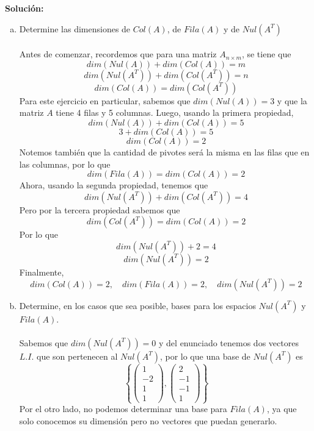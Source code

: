 \documentclass[12pt]{article}
\newenvironment{solucion}
{\begin{mdframed}[backgroundcolor=black!10]
		{\bf Solución:}\\
	}
	{
	\end{mdframed}
}
\newenvironment{preguntas}
{\begin{enumerate}\itemsep12pt
	}
	{
	\end{enumerate}
}
\begin{document}
\begin{preguntas}
\begin{solucion}
\begin{enumerate}[a)]
\item Determine las dimensiones de $Col(A)$, de $Fila(A)$ y de $Nul(A^T)$\\
			\\
			Antes de comenzar, recordemos que para una matriz $A_{n\times m}$, se tiene que
			$$dim(Nul(A)) + dim(Col(A)) = m$$
			$$dim(Nul(A^T)) + dim(Col(A^T)) = n$$
			$$dim(Col(A)) = dim(Col(A^T))$$
			Para este ejercicio en particular, sabemos que $dim(Nul(A)) = 3$ y que la matriz $A$ tiene 4 filas y 5 columnas. Luego, usando la primera propiedad,
			$$dim(Nul(A)) + dim(Col(A)) = 5$$
			$$3 + dim(Col(A)) = 5$$
			$$dim(Col(A)) = 2$$
			Notemos también que la cantidad de pivotes será la misma en las filas que en las columnas, por lo que
			$$dim(Fila(A)) = dim(Col(A)) = 2$$
			Ahora, usando la segunda propiedad, tenemos que
			$$dim(Nul(A^T)) + dim(Col(A^T)) = 4$$
			Pero por la tercera propiedad sabemos que 
			$$dim(Col(A^T)) = dim(Col(A)) = 2$$
			Por lo que
			$$dim(Nul(A^T)) + 2 = 4$$
			$$dim(Nul(A^T)) = 2$$
			Finalmente,
			$$dim(Col(A))=2,\quad dim(Fila(A))=2, \quad dim(Nul(A^T))=2$$
\item Determine, en los casos que sea posible, bases para los espacios $Nul(A^T)$ y $Fila(A)$.\\
			\\
			Sabemos que $dim(Nul(A^T))=0$ y del enunciado tenemos dos vectores $L.I.$ que son pertenecen al $Nul(A^T)$, por lo que una base de $Nul(A^T)$ es
			$$\left\{ \begin{pmatrix}
			1 \\ -2 \\ 1 \\ 1
			\end{pmatrix},
			\begin{pmatrix}
			2 \\ -1 \\ -1 \\ 1
			\end{pmatrix}\right\}$$
			Por el otro lado, no podemos determinar una base para $Fila(A)$, ya que solo conocemos su dimensión pero no vectores que puedan generarlo.
\end{enumerate}
\end{solucion}
\end{preguntas}
\end{document}
